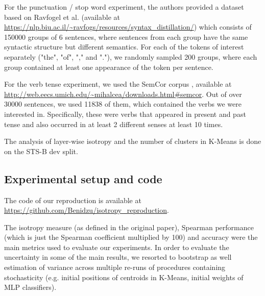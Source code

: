 For the punctuation / stop word experiment, the authors provided a dataset based on Ravfogel et al. \cite{punc} (available at \url{https://nlp.biu.ac.il/~ravfogs/resources/syntax_distillation/}) which consists of 150000 groups of 6 sentences, where sentences from each group have the same syntactic structure but different semantics. For each of the tokens of interest separately ("the", "of", "," and "."), we randomly sampled 200 groups, where each group contained at least one appearance of the token per sentence.

For the verb tense experiment, we used the SemCor corpus \cite{semcor}, available at \url{http://web.eecs.umich.edu/~mihalcea/downloads.html#semcor}. Out of over 30000 sentences, we used 11838 of them, which contained the verbs we were interested in. Specifically, these were verbs that appeared in present and past tense and also occurred in at least 2 different senses at least 10 times. 

The analysis of layer-wise isotropy and the number of clusters in K-Means is done on the STS-B dev split.





\subsection{Experimental setup and code}

The code of our reproduction is available at \url{https://github.com/Benidzu/isotropy_reproduction}.

The isotropy measure (as defined in the original paper), Spearman performance (which is just the Spearman coefficient multiplied by 100) and accuracy were the main metrics used to evaluate our experiments. In order to evaluate the uncertainty in some of the main results, we resorted to bootstrap as well estimation of variance across multiple re-runs of procedures containing stochasticity (e.g. initial positions of centroids in K-Means, initial weights of MLP classifiers). 


